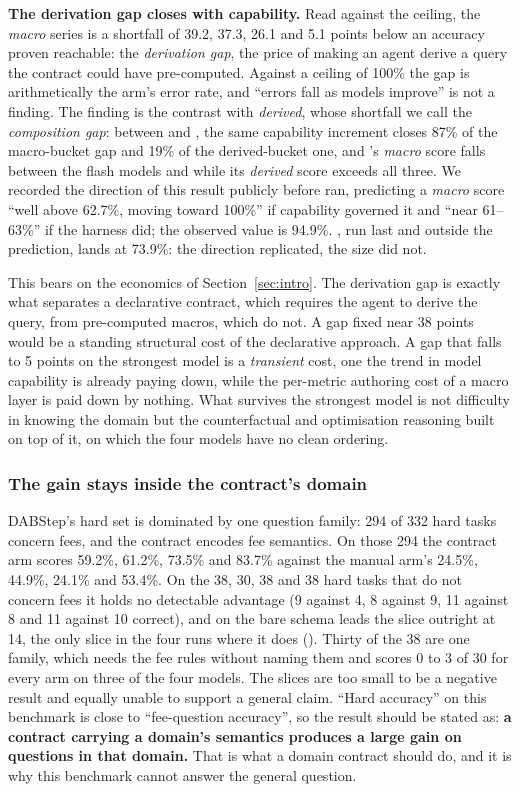 \textbf{The derivation gap closes with capability.} Read against the
ceiling, the \emph{macro} series is a shortfall of 39.2, 37.3, 26.1 and 5.1
points below an accuracy proven reachable: the \emph{derivation gap}, the
price of making an agent derive a query the contract could have
pre-computed. Against a ceiling of 100\% the gap is arithmetically the arm's
error rate, and ``errors fall as models improve'' is not a finding. The
finding is the contrast with \emph{derived}, whose shortfall we call the
\emph{composition gap}: between \mGLM{} and \mGPT{}, the same capability increment closes 87\% of the
macro-bucket gap and 19\% of the derived-bucket one, and \mSON{}'s
\emph{macro} score falls between the flash models and \mGPT{} while its
\emph{derived} score exceeds all three. We recorded the direction of this
result publicly before \mGPT{} ran, predicting a \emph{macro} score ``well
above 62.7\%, moving toward 100\%'' if capability governed it and ``near
61--63\%'' if the harness did; the observed value is 94.9\%. \mSON{}, run
last and outside the prediction, lands at 73.9\%: the direction replicated,
the size did not.

This bears on the economics of Section~\ref{sec:intro}. The derivation gap
is exactly what separates a declarative contract, which requires the agent
to derive the query, from pre-computed macros, which do not. A gap fixed
near 38 points would be a standing structural cost of the declarative
approach. A gap that falls to 5 points on the strongest model is a
\emph{transient} cost, one the trend in model capability is already paying
down, while the per-metric authoring cost of a macro layer is paid down by
nothing. What survives the strongest model is not difficulty in knowing the
domain but the counterfactual and optimisation reasoning built on top of it,
on which the four models have no clean ordering.

\subsubsection{The gain stays inside the contract's domain}
\label{sec:domain}

DABStep's hard set is dominated by one question family: 294 of 332 hard
tasks concern fees, and the contract encodes fee semantics. On those 294 the
contract arm scores 59.2\%, 61.2\%, 73.5\% and 83.7\% against the manual
arm's 24.5\%, 44.9\%, 24.1\% and 53.4\%. On the 38, 30, 38 and 38 hard tasks
that do not concern fees it holds no detectable advantage (9 against 4, 8
against 9, 11 against 8 and 11 against 10 correct), and on \mGPT{} the bare
schema leads the slice outright at 14, the only slice in the four runs where
it does (). Thirty of the 38 are one family, which needs
the fee rules without naming them and scores 0 to 3 of 30 for every arm on
three of the four models. The slices are too small to be a negative result
and equally unable to support a general claim. ``Hard accuracy'' on this
benchmark is close to ``fee-question accuracy'', so the result should be
stated as: \textbf{a contract carrying a domain's semantics produces a large
gain on questions in that domain.} That is what a domain contract should do,
and it is why this benchmark cannot answer the general question.

